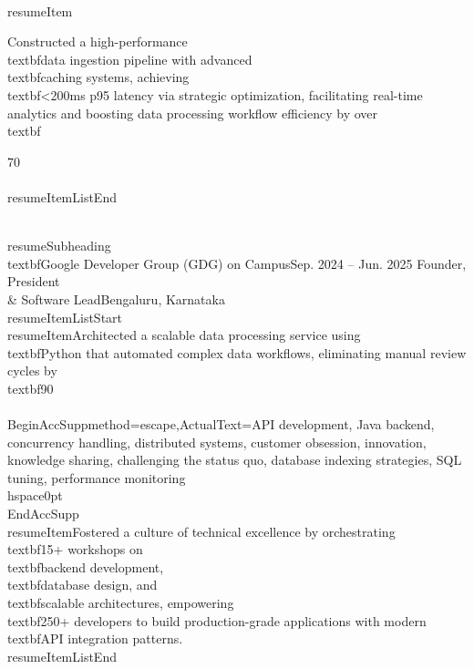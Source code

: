 \documentclass[a4paper]{extarticle}
\makeatletter
\renewcommand\normalsize{\fontsize{9}{11}\selectfont}
\newcommand{\resumeItem}[1]{
  \item\normalsize{
    {#1 \vspace{-2pt}}
  }
}
\newcommand{\resumeSubheading}[4]{
  \vspace{-2pt}\item
    \begin{tabular*}{1.0\textwidth}[t]{l@{\extracolsep{\fill}}r}
      \textbf{#1} & \textbf{\small #2} \
      \textit{\small#3} & \textit{\small #4} \
    \end{tabular*}\vspace{-7pt}
}
\newcommand{\resumeItemListStart}{\begin{itemize}}
\newcommand{\resumeItemListEnd}{\end{itemize}\vspace{-8pt}}
\makeatother
\begin{document}
        \\resumeItem{Constructed a high-performance \\textbf{data ingestion pipeline} with advanced \\textbf{caching systems}, achieving \\textbf{<200ms p95} latency via strategic optimization, facilitating real-time analytics and boosting data processing workflow efficiency by over \\textbf{70\\%
    \\resumeItemListEnd
   
    \\resumeSubheading
    {\\textbf{Google Developer Group (GDG) on Campus}}{Sep. 2024 -- Jun. 2025}
    {Founder, President \\& Software Lead}{Bengaluru, Karnataka}
    \\resumeItemListStart
        \\resumeItem{Architected a scalable data processing service using \\textbf{Python} that automated complex data workflows, eliminating manual review cycles by \\textbf{90\\%
        \\BeginAccSupp{method=escape,ActualText={API development, Java backend, concurrency handling, distributed systems, customer obsession, innovation, knowledge sharing, challenging the status quo, database indexing strategies, SQL tuning, performance monitoring}}\\hspace{0pt}\\EndAccSupp{}
        \\resumeItem{Fostered a culture of technical excellence by orchestrating \\textbf{15+} workshops on \\textbf{backend development}, \\textbf{database design}, and \\textbf{scalable architectures}, empowering \\textbf{250+} developers to build production-grade applications with modern \\textbf{API integration} patterns.}
    \\resumeItemListEnd
}}}}
\end{document}
